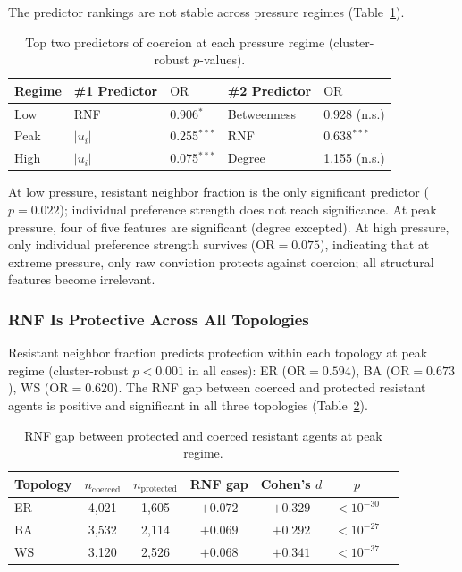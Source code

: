 \documentclass[11pt, a4paper]{article}
\newcommand{\OR}{\text{OR}}
\begin{document}
The predictor rankings are not stable across pressure regimes (Table~\ref{tab:regime_shift}).

\begin{table}[H]
\centering
\caption{Top two predictors of coercion at each pressure regime (cluster-robust $p$-values).}
\label{tab:regime_shift}
\begin{tabular}{lllll}
\toprule
\textbf{Regime} & \textbf{\#1 Predictor} & $\OR$ & \textbf{\#2 Predictor} & $\OR$ \\
\midrule
Low & RNF & 0.906$^*$ & Betweenness & 0.928 (n.s.) \\
Peak & $|u_i|$ & 0.255$^{***}$ & RNF & 0.638$^{***}$ \\
High & $|u_i|$ & 0.075$^{***}$ & Degree & 1.155 (n.s.) \\
\bottomrule
\end{tabular}
\end{table}

At low pressure, resistant neighbor fraction is the only significant predictor ($p = 0.022$); individual preference strength does not reach significance. At peak pressure, four of five features are significant (degree excepted). At high pressure, only individual preference strength survives ($\OR = 0.075$), indicating that at extreme pressure, only raw conviction protects against coercion; all structural features become irrelevant.

\subsubsection{RNF Is Protective Across All Topologies}

Resistant neighbor fraction predicts protection within each topology at peak regime (cluster-robust $p < 0.001$ in all cases): ER ($\OR = 0.594$), BA ($\OR = 0.673$), WS ($\OR = 0.620$). The RNF gap between coerced and protected resistant agents is positive and significant in all three topologies (Table~\ref{tab:rnf_gap}).

\begin{table}[H]
\centering
\caption{RNF gap between protected and coerced resistant agents at peak regime.}
\label{tab:rnf_gap}
\begin{tabular}{lcccccc}
\toprule
\textbf{Topology} & $n_{\text{coerced}}$ & $n_{\text{protected}}$ & \textbf{RNF gap} & \textbf{Cohen's} $d$ & $p$ \\
\midrule
ER & 4{,}021 & 1{,}605 & $+0.072$ & $+0.329$ & $< 10^{-30}$ \\
BA & 3{,}532 & 2{,}114 & $+0.069$ & $+0.292$ & $< 10^{-27}$ \\
WS & 3{,}120 & 2{,}526 & $+0.068$ & $+0.341$ & $< 10^{-37}$ \\
\bottomrule
\end{tabular}
\end{table}
\end{document}
